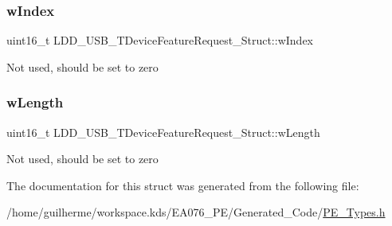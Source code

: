 \subsubsection{\texorpdfstring{w\+Index}{wIndex}}
{\footnotesize\ttfamily uint16\+\_\+t L\+D\+D\+\_\+\+U\+S\+B\+\_\+\+T\+Device\+Feature\+Request\+\_\+\+Struct\+::w\+Index}

Not used, should be set to zero \mbox{\label{struct_l_d_d___u_s_b___t_device_feature_request___struct_af0c222aa4585a132b2582fb1c290edc7}} 
\subsubsection{\texorpdfstring{w\+Length}{wLength}}
{\footnotesize\ttfamily uint16\+\_\+t L\+D\+D\+\_\+\+U\+S\+B\+\_\+\+T\+Device\+Feature\+Request\+\_\+\+Struct\+::w\+Length}

Not used, should be set to zero 

The documentation for this struct was generated from the following file\+:\begin{DoxyCompactItemize}
\item 
/home/guilherme/workspace.\+kds/\+E\+A076\+\_\+\+P\+E/\+Generated\+\_\+\+Code/\hyperlink{_p_e___types_8h}{P\+E\+\_\+\+Types.\+h}\end{DoxyCompactItemize}
